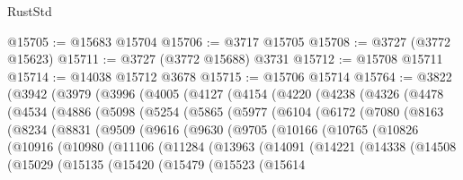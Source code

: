 \begin{lexlean}{RustStd}
\begin{coremodule}
@15705 := @15683 @15704
@15706 := @3717 @15705
@15708 := @3727 (@3772 @15623)
@15711 := @3727 (@3772 @15688) @3731
@15712 := @15708 @15711
@15714 := @14038 @15712 @3678
@15715 := @15706 @15714
@15764 := @3822
    (@3942
      (@3979
        (@3996
          (@4005
            (@4127
              (@4154
                (@4220
                  (@4238
                    (@4326
                      (@4478
                        (@4534
                          (@4886
                            (@5098
                              (@5254
                                (@5865
                                  (@5977
                                    (@6104
                                      (@6172
                                        (@7080
                                          (@8163
                                            (@8234
                                              (@8831
                                                (@9509
                                                  (@9616
                                                    (@9630
                                                      (@9705
                                                        (@10166
                                                          (@10765
                                                            (@10826
                                                              (@10916
                                                                (@10980
                                                                  (@11106
                                                                    (@11284
                                                                      (@13963
                                                                        (@14091
                                                                          (@14221
                                                                            (@14338
                                                                              (@14508
                                                                                (@15029
                                                                                  (@15135
                                                                                    (@15420
                                                                                      (@15479
                                                                                        (@15523
                                                                                          (@15614

\end{coremodule}
\end{lexlean}
